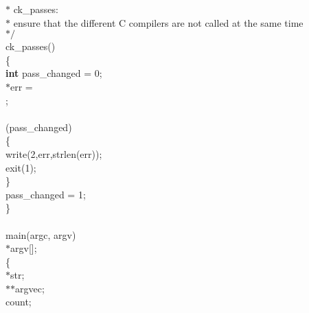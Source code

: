 \begin{flushleft}
{\hspace*{1\indentation}$\ast$ ck\_passes:\mbox{}\\
\hspace*{1\indentation}$\ast$ ensure that the different C compilers are not called at the same time\mbox{}\\
\hspace*{1\indentation}$\ast/$}\mbox{}\\
ck\_passes()\mbox{}\\
\{\mbox{}\\
\hspace*{3\indentation}{\bf static} {\bf int}  pass\_changed = 0;\mbox{}\\
\hspace*{3\indentation}{\bf char}  $\ast$err = \mbox{}\\
\hspace*{6\indentation}{\tt"cc: the -ack, -sozo, -c68s and -c68l flags are exclusive$\backslash$n"};\mbox{}\\
\mbox{}\\
\hspace*{3\indentation}{\bf if} (pass\_changed)\mbox{}\\
\hspace*{3\indentation}\{\mbox{}\\
\hspace*{6\indentation}write(2,err,strlen(err));\mbox{}\\
\hspace*{6\indentation}exit(1);\mbox{}\\
\hspace*{3\indentation}\}\mbox{}\\
\hspace*{3\indentation}pass\_changed = 1;\mbox{}\\
\}\mbox{}\\
\mbox{}\\
main(argc, argv)\mbox{}\\
\hspace*{3\indentation}{\bf char} $\ast$argv[];\mbox{}\\
\{\mbox{}\\
\hspace*{3\indentation}{\bf char} $\ast$str;\mbox{}\\
\hspace*{3\indentation}{\bf char} $\ast$$\ast$argvec;\mbox{}\\
\hspace*{3\indentation}{\bf int} count;\mbox{}\\
$$
\end{flushleft}

